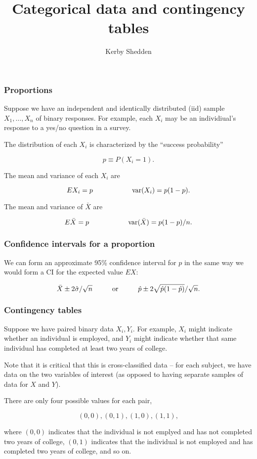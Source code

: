 \documentclass{beamer}
\title{Categorical data and contingency tables}
\author{Kerby Shedden}
\institute{Department of Statistics, University of Michigan}
\begin{document}
\maketitle



\begin{frame}
\frametitle{Proportions}

Suppose we have an independent and identically distributed (iid)
sample $X_1, \ldots, X_n$ of binary responses. For example, each $X_i$
may be an individiual's response to a yes/no question in a survey.

The distribution of each $X_i$ is characterized by the ``success
probability'' 

\vspace{-0.5cm}

$$p \equiv P(X_i=1).$$

The mean and variance of each $X_i$ are

$$
EX_i = p \hspace{2cm} {\rm var}(X_i) = p(1-p).
$$

The mean and variance of $\bar{X}$ are

$$
E\bar{X} = p \hspace{2cm} {\rm var}(\bar{X}) = p(1-p)/n.
$$

\end{frame}



\begin{frame}
\frametitle{Confidence intervals for a proportion}

We can form an approximate 95\% confidence interval for $p$ in the
same way we would form a CI for the expected value $EX$:


$$ \bar{X} \pm 2\hat{\sigma}/\sqrt{n} \hspace{1cm} {\rm
  or} \hspace{1cm} \hat{p} \pm 2
\sqrt{\hat{p}(1-\hat{p})}/\sqrt{n}.
$$


\end{frame}


\begin{frame}
\frametitle{Contingency tables}

Suppose we have paired binary data $X_i,Y_i$.  For example, $X_i$
might indicate whether an individual is employed, and $Y_i$ might
indicate whether that same individual has completed at least two years
of college.

Note that it is critical that this is cross-classified data -- for
each subject, we have data on the two variables of interest (as
opposed to having separate samples of data for $X$ and $Y$).

There are only four possible values for each pair,

$$
(0,0), (0,1), (1,0), (1,1),
$$

where $(0,0)$ indicates that the individual is not emplyed and has not
completed two years of college, $(0,1)$ indicates that the individual
is not employed and has completed two years of college, and so on.

\end{frame}
\end{document}
